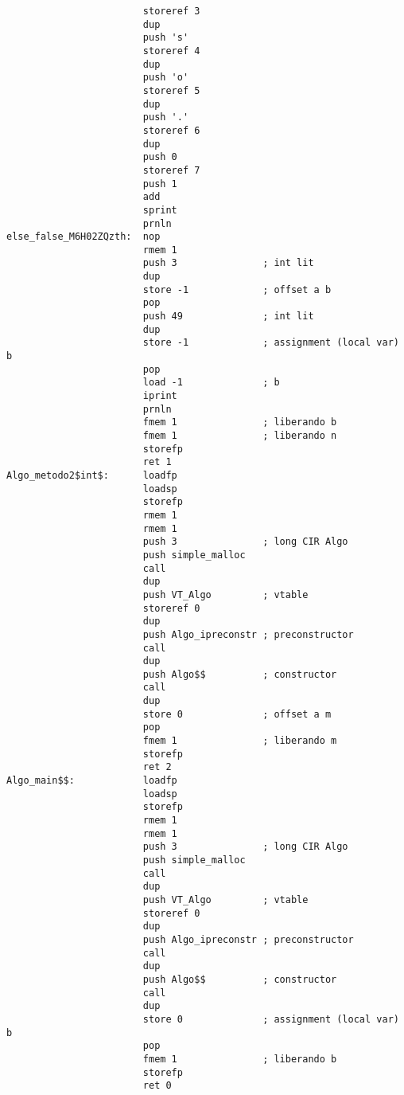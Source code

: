 \documentclass [a4paper,abstracton,titlepage]{scrartcl}
\begin{document}
\begin{lstlisting}
                        storeref 3
                        dup
                        push 's'
                        storeref 4
                        dup
                        push 'o'
                        storeref 5
                        dup
                        push '.'
                        storeref 6
                        dup
                        push 0
                        storeref 7
                        push 1
                        add
                        sprint
                        prnln
else_false_M6H02ZQzth:  nop
                        rmem 1
                        push 3               ; int lit
                        dup
                        store -1             ; offset a b
                        pop
                        push 49              ; int lit
                        dup
                        store -1             ; assignment (local var) b
                        pop
                        load -1              ; b
                        iprint
                        prnln
                        fmem 1               ; liberando b
                        fmem 1               ; liberando n
                        storefp
                        ret 1
Algo_metodo2$int$:      loadfp
                        loadsp
                        storefp
                        rmem 1
                        rmem 1
                        push 3               ; long CIR Algo
                        push simple_malloc
                        call
                        dup
                        push VT_Algo         ; vtable
                        storeref 0
                        dup
                        push Algo_ipreconstr ; preconstructor
                        call
                        dup
                        push Algo$$          ; constructor
                        call
                        dup
                        store 0              ; offset a m
                        pop
                        fmem 1               ; liberando m
                        storefp
                        ret 2
Algo_main$$:            loadfp
                        loadsp
                        storefp
                        rmem 1
                        rmem 1
                        push 3               ; long CIR Algo
                        push simple_malloc
                        call
                        dup
                        push VT_Algo         ; vtable
                        storeref 0
                        dup
                        push Algo_ipreconstr ; preconstructor
                        call
                        dup
                        push Algo$$          ; constructor
                        call
                        dup
                        store 0              ; assignment (local var) b
                        pop
                        fmem 1               ; liberando b
                        storefp
                        ret 0
\end{lstlisting}
\end{document}
